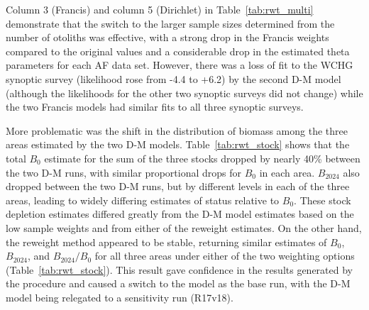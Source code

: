 \documentclass[11pt]{book}
\newcommand{\pc}{\%}
\begin{document}
Column 3 (Francis) and column 5 (Dirichlet) in Table~\ref{tab:rwt_multi} demonstrate that the switch to the larger sample sizes determined from the number of otoliths was effective, with a strong drop in the Francis weights compared to the original values and a considerable drop in the estimated theta parameters for each AF data set. 
However, there was a loss of fit to the WCHG synoptic survey (likelihood rose from -4.4 to +6.2) by the second D-M model (although the likelihoods for the other two synoptic surveys did not change) while the two Francis models had similar fits to all three synoptic surveys.

More problematic was the shift in the distribution of biomass among the three areas estimated by the two D-M models. 
Table~\ref{tab:rwt_stock} shows that the total $B_0$ estimate for the sum of the three stocks dropped by nearly 40\pc{} between the two D-M runs, with similar proportional drops for $B_0$ in each area.
$B_{2024}$ also dropped between the two D-M runs, but by different levels in each of the three areas, leading to widely differing estimates of status relative to $B_0$.
These stock depletion estimates differed greatly from the D-M model estimates based on the low sample weights and from either of the \citet{Francis:2011} reweight estimates. 
On the other hand, the \citet{Francis:2011} reweight method appeared to be stable, returning similar estimates of $B_0$, $B_{2024}$, and $B_{2024}/B_0$ for all three areas under either of the two weighting options (Table~\ref{tab:rwt_stock}). 
This result gave confidence in the results generated by the \citet{Francis:2011} procedure and caused a switch to the \citet{Francis:2011} model as the base run, with the D-M model being relegated to a sensitivity run (R17v18).
\end{document}
